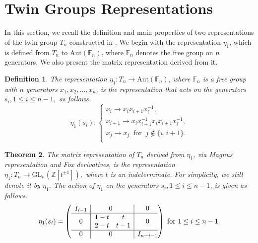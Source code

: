 \documentclass[reqno]{amsart}
\newtheorem{theorem}{Theorem}
\newtheorem{definition}[theorem]{Definition}
\begin{document}
\section{Twin Groups Representations}

In this section, we recall the definition and main properties of two representations of the twin group $T_n$ constructed in \cite{Nasser2025}. We begin with the representation $\eta_1$, which is defined from $T_n$ to $\mathrm{Aut}(\mathbb{F}_n)$, where $\mathbb{F}_n$ denotes the free group on $n$ generators. We also present the matrix representation derived from it.

\begin{definition} \cite{Nasser2025} \label{defeta1}
The representation  $\eta_1: T_n \longrightarrow \mathrm{Aut}(\mathbb{F}_n)$, where $\mathbb{F}_n$ is a free group with $n$ generators $x_1,x_2,\ldots, x_n$, is the representation that acts on the generators $s_i, 1\leq i \leq n-1,$ as follows.
$$\eta_1(s_i):
\left\{\begin{array}{l}
x_i\rightarrow x_ix_{i+1}x_i^{-1},\\
x_{i+1}\rightarrow x_ix_{i+1}^{-1}x_ix_{i+1}x_i^{-1},\\
x_j\rightarrow x_j \ \text{ for } \ j \notin \{i,i+1\} . \\
\end{array}\right.$$
\end{definition}

\begin{theorem} \cite{Nasser2025} \label{defeta1matrix}
The matrix representation of \(T_n\) derived from \(\eta_1\), via Magnus representation and Fox derivatives, is the representation $\eta_1: T_n \longrightarrow \mathrm{GL}_n(\mathbb{Z}[t^{\pm 1}]),$ where \(t\) is an indeterminate. For simplicity, we still denote it by \(\eta_1\). The action of $\eta_1$ on the generators $s_i, 1 \le i \le n-1$, is given as follows.
$$\eta_1(s_i)= \left( \begin{array}{c|@{}c|c@{}}
   \begin{matrix}
     I_{i-1} 
   \end{matrix} 
      & 0 & 0 \\
      \hline
    0 &\hspace{0.2cm} \begin{matrix}
   	1-t & t\\
   	2-t & t-1\\
\end{matrix}  & 0  \\
\hline
0 & 0 & I_{n-i-1}
\end{array} \right) \text{ for } 1\leq i \leq n-1.$$ 
\end{theorem}
\end{document}
